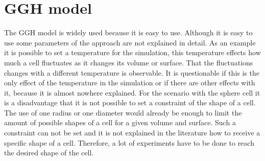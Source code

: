 \section{GGH model}
The \ac{GGH} model is widely used because it is easy to use. Although it is easy to use some parameters of the approach are not explained in detail. As an example it is possible to set a temperature for the simulation, this temperature effects how much a cell fluctuates as it changes its volume or surface. That the fluctuations changes with a different temperature is observable. It is questionable if this is the only effect of the temperature in the simulation or if there are other effects with it, because it is almost nowhere explained.  \newline
For the scenario with the sphere cell it is a disadvantage that it is not possible to set a constraint of the shape of a cell. The use of one radius or one diameter would already be enough to limit the amount of possible shapes of a cell for a given volume and surface. Such a constraint can not be set and it is not explained in the literature how to receive a specific shape of a cell. Therefore, a lot of experiments have to be done to reach the desired shape of the cell.